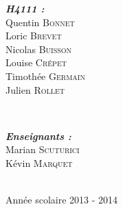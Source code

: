 \documentclass[a4paper]{report}
\begin{document}
\begin{titlepage}
\begin{minipage}{0.4\textwidth}
\begin{flushleft} \large
\textbf{\emph{H4111 :}}\\
Quentin \textsc{Bonnet}\\
Loric \textsc{Brevet}\\
Nicolas \textsc{Buisson}\\
Louise \textsc{Crépet}\\
Timothée \textsc{Germain}\\
Julien \textsc{Rollet}%
\end{flushleft}
\end{minipage}
~
\begin{minipage}{0.4\textwidth}
\begin{flushright} \large
\textbf{\emph{Enseignants :}} \\
Marian \textsc{Scuturici}\\
Kévin \textsc{Marquet}%
\end{flushright}
\end{minipage}\\[4cm]



{\large Année scolaire 2013 - 2014}\\[3cm] %


 

\vfill %

\end{titlepage}

\clearpage
\tableofcontents
\clearpage









\end{document}
